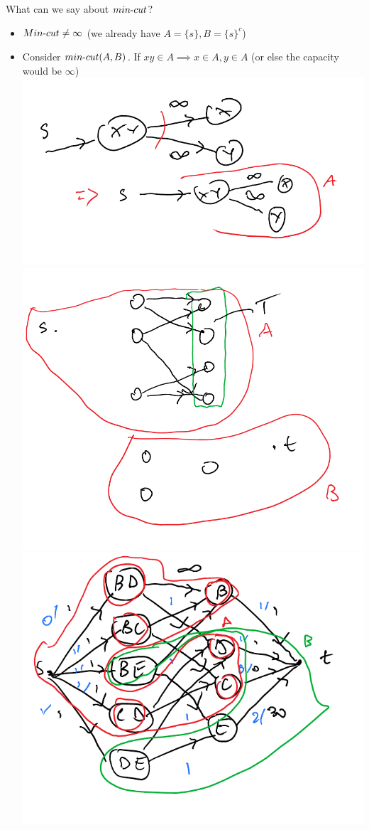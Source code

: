 \documentclass[12 pt]{article}
\begin{document}
        What can we say about $min\hbox{-}cut$?
        \begin{itemize}
        \item $Min\hbox{-}cut \neq \infty$ (we already have $A=\{s\},
          B=\{s\}^c$)
        \item Consider $min\hbox{-}cut(A,B)$. If $xy\in A \implies
          x\in A, y \in A$ (or else the capacity would be $\infty$)
          \\ \includegraphics[width=.9\textwidth]{i89.pdf}
          \\ \includegraphics[width=.9\textwidth]{i90.pdf}
          \\ \includegraphics[width=.9\textwidth]{i91.pdf}


\end{itemize}
\end{document}
